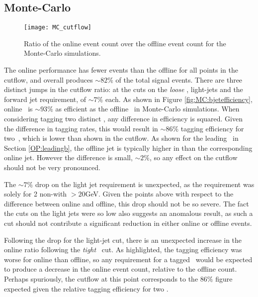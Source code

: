    \subsection{Monte-Carlo}
        \begin{figure}[h]
            \centering
            \texttt{[image: MC\_cutflow]}
            \caption[\VBFHBB\ Cutflow ratio for Monte-Carlo simulation]{Ratio of the online event count over the offline event count for the Monte-Carlo simulations.}
            \label{f:cutflowMC}
        \end{figure}

    The online performance has fewer events than the offline for all points in the cutflow, and overall produces $\sim82\%$ of the total signal events. There are three distinct jumps in the cutflow ratio: at the cuts on the \textit{loose} \bjets, light-jets and the forward jet requirement, of $\sim7\%$ each. As shown in Figure \ref{fig:MC:bjetefficiency}, online \btag\, is $\sim93\%$ as efficient as the offline \btag\ in Monte-Carlo simulations. When considering tagging two distinct \bjets, any difference in efficiency is squared. Given the difference in tagging rates, this would result in $\sim86\%$ tagging efficiency for two \bjets\,, which is lower than shown in the cutflow. As shown for the leading \bjet\ in Section \ref{OP:leadingb}, the offline jet is typically higher in \pt than the corresponding online jet. However the difference is small, $\sim2\%$, so any effect on the cutflow should not be very pronounced.

    The $\sim7\%$ drop on the light jet requirement is unexpected, as the requirement was solely for 2 non-\bjets with \pt$>20$GeV. Given the points above with respect to the \pt difference between online and offline, this drop should not be so severe. The fact the \pt cuts on the light jets were so low also suggests an anomalous result, as such a cut should not contribute a significant reduction in either online or offline events.

    Following the drop for the light-jet cut, there is an unexpected increase in the online ratio following the \textit{tight} \btagging\, cut. As highlighted, the tagging efficiency was worse for online than offline, so any requirement for a tagged \bjet\, would be expected to produce a decrease in the online event count, relative to the offline count. Perhaps spuriously, the cutflow at this point corresponds to the $86\%$ figure expected given the relative tagging efficiency for two \bjets.

